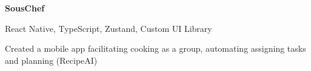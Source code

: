 {    \vspace{0.10 cm}
    \begin{twocolentry_proj}{
        \mbox{}%
    }
    \fontsize{11 pt}{11 pt}\textbf{SousChef}
    \end{twocolentry_proj}
    \begin{onecolentry}
        React Native, TypeScript, Zustand, Custom UI Library  
        \begin{highlights}
            \item Created a mobile app facilitating cooking as a group, automating assigning tasks and planning (RecipeAI)
        \end{highlights}
    \end{onecolentry}
}




